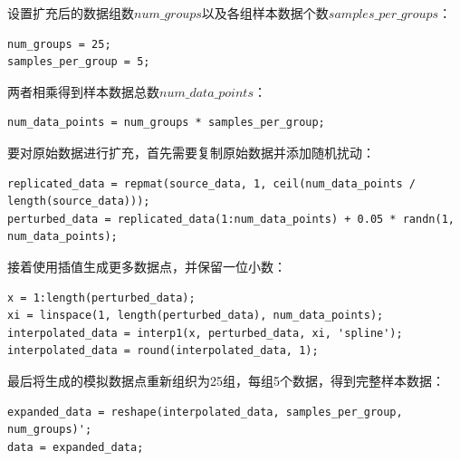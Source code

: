 \documentclass[12pt]{article}  %
\begin{document}
设置扩充后的数据组数$num\_groups$以及各组样本数据个数$samples\_per\_groups$：

\begin{lstlisting}
num_groups = 25;
samples_per_group = 5;
\end{lstlisting}

两者相乘得到样本数据总数$num\_data\_points$：
\begin{lstlisting}
num_data_points = num_groups * samples_per_group;
\end{lstlisting}

要对原始数据进行扩充，首先需要复制原始数据并添加随机扰动：
\begin{lstlisting}
replicated_data = repmat(source_data, 1, ceil(num_data_points / length(source_data)));
perturbed_data = replicated_data(1:num_data_points) + 0.05 * randn(1, num_data_points);
\end{lstlisting}

接着使用插值生成更多数据点，并保留一位小数：
\begin{lstlisting}
x = 1:length(perturbed_data);
xi = linspace(1, length(perturbed_data), num_data_points);
interpolated_data = interp1(x, perturbed_data, xi, 'spline');
interpolated_data = round(interpolated_data, 1);
\end{lstlisting}

最后将生成的模拟数据点重新组织为25组，每组5个数据，得到完整样本数据：
\begin{lstlisting}
expanded_data = reshape(interpolated_data, samples_per_group, num_groups)';
data = expanded_data;
\end{lstlisting}
\end{document}
